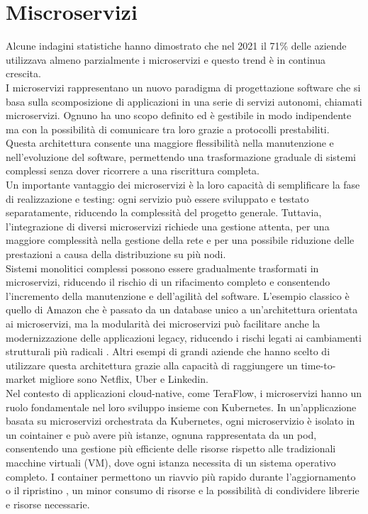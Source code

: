 \section{Miscroservizi}
Alcune indagini statistiche hanno dimostrato che nel 2021 il 71\% delle aziende utilizzava almeno parzialmente i microservizi \cite{stat} e questo trend è in continua crescita.
\\I microservizi rappresentano un nuovo paradigma di progettazione software che si basa sulla scomposizione di applicazioni in una serie di servizi autonomi, chiamati microservizi.
Ognuno ha uno scopo definito ed è gestibile in modo indipendente ma con la possibilità di comunicare tra loro grazie a protocolli prestabiliti.
Questa architettura consente una maggiore flessibilità nella manutenzione e nell'evoluzione del software, permettendo una trasformazione graduale di sistemi complessi senza dover ricorrere a una riscrittura completa.
\\Un importante vantaggio dei microservizi è la loro capacità di semplificare la fase di realizzazione e testing: ogni servizio può essere sviluppato e testato separatamente, riducendo la complessità del progetto generale.
Tuttavia, l'integrazione di diversi microservizi richiede una gestione attenta, per una maggiore complessità nella gestione della rete e per una possibile riduzione delle prestazioni a causa della distribuzione su più nodi.
\\Sistemi monolitici complessi possono essere gradualmente trasformati in microservizi, riducendo il rischio di un rifacimento completo e consentendo l'incremento della manutenzione e dell'agilità del software.
L'esempio classico è quello di Amazon che è passato da un database unico a un'architettura orientata ai microservizi, ma la modularità dei microservizi può facilitare anche la modernizzazione delle applicazioni legacy, 
riducendo i rischi legati ai cambiamenti strutturali più radicali \cite{microse}. 
Altri esempi di grandi aziende che hanno scelto di utilizzare questa architettura grazie alla capacità di raggiungere un time-to-market migliore sono Netflix, Uber e Linkedin.
\\Nel contesto di applicazioni cloud-native, come TeraFlow, i microservizi hanno un ruolo fondamentale nel loro sviluppo insieme con Kubernetes.
In un'applicazione basata su microservizi orchestrata da Kubernetes, %
ogni microservizio è isolato in un cointainer e può avere più istanze, ognuna rappresentata da un pod, consentendo una gestione più efficiente delle risorse rispetto alle tradizionali macchine virtuali (VM),
dove ogni istanza necessita di un sistema operativo completo.
I container permettono un riavvio più rapido durante l'aggiornamento o il ripristino \cite{artkub}, un minor consumo di risorse
e la possibilità di condividere librerie e risorse necessarie.


